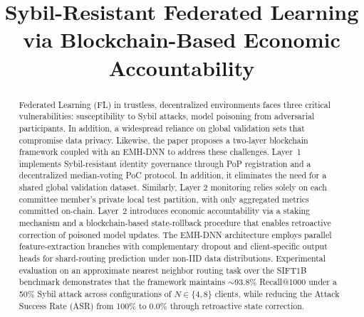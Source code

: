 \documentclass[conference]{IEEEtran}
\begin{document}
\title{Sybil-Resistant Federated Learning via Blockchain-Based Economic Accountability}

\author{
    
    \vspace{0.2cm}
    
}
\maketitle
\pagestyle{plain}
\begin{abstract}
Federated Learning (FL) in trustless, decentralized environments faces three critical vulnerabilities: susceptibility to Sybil attacks, model poisoning from adversarial participants. In addition, a widespread reliance on global validation sets that compromise data privacy. Likewise, the paper proposes a two-layer blockchain framework coupled with an EMH-DNN to address these challenges. Layer~1 implements Sybil-resistant identity governance through PoP registration and a decentralized median-voting PoC protocol. In addition, it eliminates the need for a shared global validation dataset. Similarly, Layer 2 monitoring relies solely on each committee member's private local test partition, with only aggregated metrics committed on-chain. Layer~2 introduces economic accountability via a staking mechanism and a blockchain-based state-rollback procedure that enables retroactive correction of poisoned model updates. The EMH-DNN architecture employs parallel feature-extraction branches with complementary dropout and client-specific output heads for shard-routing prediction under non-IID data distributions. Experimental evaluation on an approximate nearest neighbor routing task over the SIFT1B benchmark demonstrates that the framework maintains $\sim$93.8\% Recall@1000 under a 50\% Sybil attack across configurations of $N \in \{4, 8\}$ clients, while reducing the Attack Success Rate (ASR) from 100\% to 0.0\% through retroactive state correction.
\end{abstract}
\end{document}
